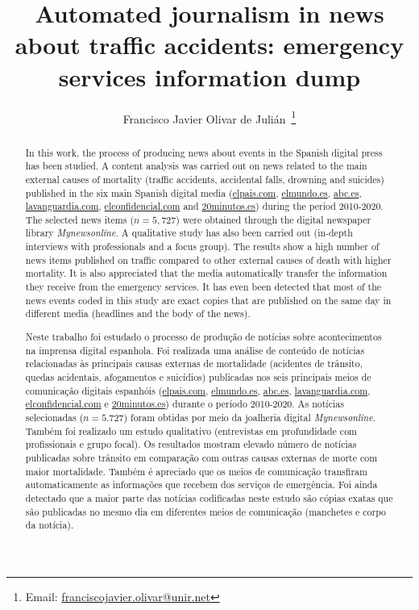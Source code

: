 \documentclass[english]{textolivre}
\title{Automated journalism in news about traffic accidents: emergency services information dump}
\author[1]{Francisco Javier Olivar de Julián~\orcid{0000-0002-2030-2458}\thanks{Email: \href{mailto:franciscojavier.olivar@unir.net}{franciscojavier.olivar@unir.net}}}
\affil[1]{Universidad Internacional de La Rioja, Facultad de Empresa y Comunicación / ESIT, Logroño, La Rioja, España.}
\begin{document}
\maketitle
\begin{polyabstract}
\begin{abstract}
In this work, the process of producing news about
events in the Spanish digital press has been studied. A content analysis
was carried out on news related to the main external causes of mortality
(traffic accidents, accidental falls, drowning and suicides) published
in the six main Spanish digital media (\url{elpais.com}, \url{ elmundo.es}, \url{abc.es}, \url{lavanguardia.com}, \url{elconfidencial.com} and \url{20minutos.es})
during the period 2010-2020. The selected news items ($n=5,727$) were
obtained through the digital newspaper library \emph{Mynewsonline}. A
qualitative study has also been carried out (in-depth interviews with
professionals and a focus group). The results show a high number of news
items published on traffic compared to other external causes of death
with higher mortality. It is also appreciated that the media
 automatically transfer the information they receive from the emergency
services. It has even been detected that most of the news events coded
in this study are exact copies that are published on the same day in
different media (headlines and the body of the news).

\end{abstract}

\begin{portuguese}
\begin{abstract}
Neste trabalho foi estudado o processo de produção de
notícias sobre acontecimentos na imprensa digital espanhola. Foi
realizada uma análise de conteúdo de notícias relacionadas às principais
causas externas de mortalidade (acidentes de trânsito, quedas
acidentais, afogamentos e suicídios) publicadas nos seis principais
meios de comunicação digitais espanhóis (\url{elpais.com}, \url{ elmundo.es}, \url{abc.es}, \url{lavanguardia.com}, \url{elconfidencial.com} e \url{20minutos.es})
durante o período 2010-2020. As notícias selecionadas ($n=5.727$) foram
obtidas por meio da joalheria digital \emph{Mynewsonline}. Também foi
realizado um estudo qualitativo (entrevistas em profundidade com
profissionais e grupo focal). Os resultados mostram elevado número de
notícias publicadas sobre trânsito em comparação com outras causas
externas de morte com maior mortalidade. Também é apreciado que os meios
de comunicação transfiram automaticamente as informações que recebem dos
serviços de emergência. Foi ainda detectado que a maior parte das
notícias codificadas neste estudo são cópias exatas que são publicadas
no mesmo dia em diferentes meios de comunicação (manchetes e corpo da
notícia).

\end{abstract}
\end{portuguese}
\end{polyabstract}








\printbibliography\label{sec-bib}
\end{document}
